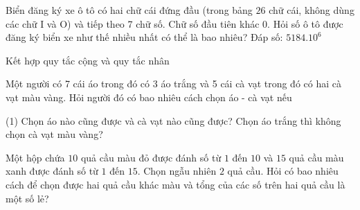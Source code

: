 \begin{vd}
	Biển đăng ký xe ô tô có hai chữ cái đứng đầu (trong bảng $26$ chữ cái, không dùng các chữ I và O) và tiếp theo 7 chữ số. Chữ số đầu tiên khác $0$. Hỏi số ô tô được đăng ký biển xe như thế nhiều nhất có thể là bao nhiêu?
	\hspace*{2cm} {\sf\fontsize{10pt}{1pt}\selectfont Đáp số: $5184.10^6$}
\end{vd} 

\begin{dang}{Kết hợp quy tắc cộng và quy tắc nhân}
\end{dang}

\begin{vd}
	Một người có 7 cái áo trong đó có 3 áo trắng và 5 cái cà vạt trong đó có hai cà vạt màu vàng. Hỏi người đó có bao nhiêu cách chọn áo - cà vạt nếu
	\begin{tasks}(1)
		\task Chọn áo nào cũng được và cà vạt nào cũng được?
		\task Chọn áo trắng thì không chọn cà vạt màu vàng?
	\end{tasks}
\end{vd} 

\begin{vd}%
	Một hộp chứa $10$ quả cầu màu đỏ được đánh số từ $1$ đến $10$ và $15$ quả cầu màu xanh được đánh số từ $1$ đến $15$. Chọn ngẫu nhiên $2$ quả cầu. Hỏi có bao nhiêu cách để chọn được hai quả cầu khác màu và tổng của các số trên hai quả cầu là một số lẻ?
\end{vd} 

